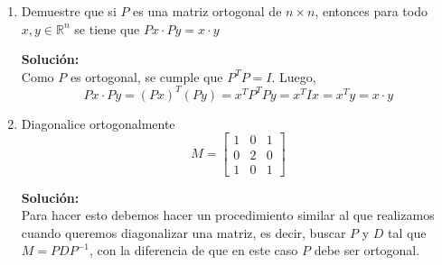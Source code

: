 \documentclass[12pt]{article}
\newenvironment{solucion}
{\begin{mdframed}[backgroundcolor=black!10]
		{\bf Solución:}\\
	}
	{
	\end{mdframed}
}
\newenvironment{preguntas}
{\begin{enumerate}\itemsep12pt
	}
	{
	\end{enumerate}
}
\newcommand{\R}{\mathbb{R}}
\begin{document}
\begin{preguntas}
\begin{solucion}
\begin{enumerate}[a)]
\end{enumerate}
\end{solucion}
\item Demuestre que si $P$ es una matriz ortogonal de  $n \times n$, entonces para todo $x, y \in \R^n$ se tiene que $Px \cdot Py = x \cdot y$
\begin{solucion}
Como $P$ es ortogonal, se cumple que $P^TP = I$. Luego,
		$$Px \cdot Py = (Px)^T(Py) = x^TP^TPy = x^TIx= x^Ty = x \cdot y$$
\end{solucion}
\item Diagonalice ortogonalmente
	$$M = \begin{bmatrix}
	1 & 0 & 1 \\
	0 & 2 & 0 \\
	1 & 0 & 1
	\end{bmatrix}$$
\begin{solucion}
Para hacer esto debemos hacer un procedimiento similar al que realizamos cuando queremos diagonalizar una matriz, es decir, buscar $P$ y $D$ tal que $M = PDP^{-1}$, con la diferencia de que en este caso $P$ debe ser ortogonal.
		

\end{solucion}
\end{preguntas}
\end{document}
